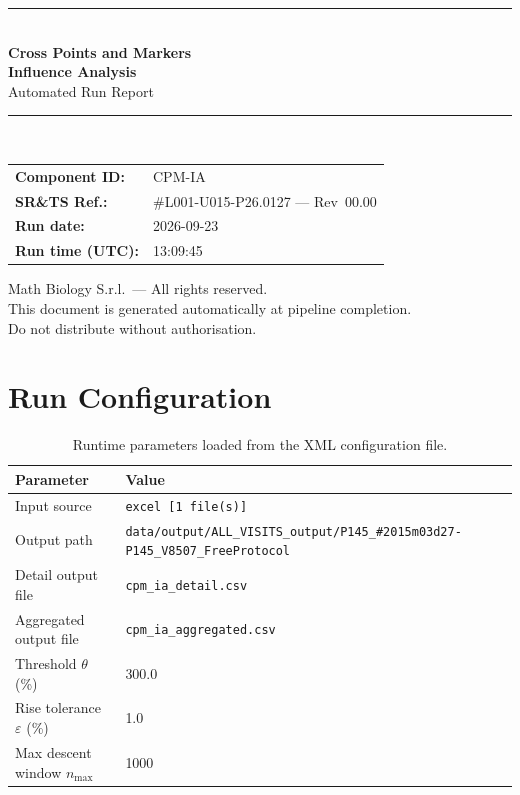\documentclass[a4paper,11pt]{article}
\begin{document}
\begin{titlepage}
\begin{center}
  \vspace*{1.8cm}
  {\color{dmaaccent}\rule{\linewidth}{1.5pt}}\\[0.6cm]
  {\LARGE\bfseries\color{dmaaccent}
    Cross Points and Markers\\[0.25cm]
    Influence Analysis}\\[0.4cm]
  {\Large Automated Run Report}\\[0.3cm]
  {\color{dmaaccent}\rule{\linewidth}{1.5pt}}\\[2cm]

  \begin{tabular}{ll}
    \textbf{Component ID:}   & CPM-IA \\[0.3cm]
    \textbf{SR\&TS Ref.:}    & \#L001-U015-P26.0127 --- Rev~00.00 \\[0.3cm]
    \textbf{Run date:}       & 2026-09-23 \\[0.3cm]
    \textbf{Run time (UTC):} & 13:09:45 \\
  \end{tabular}

  \vfill
  {\color{dmagray}\small
    Math Biology S.r.l.\ --- All rights reserved.\\
    This document is generated automatically at pipeline completion.\\
    Do not distribute without authorisation.}
\end{center}
\end{titlepage}

\tableofcontents
\clearpage

\section{Run Configuration}

\begin{table}[h!]
\centering
\small
\caption{Runtime parameters loaded from the XML configuration file.}
\begin{tabular}{ll}
\toprule
\textbf{Parameter} & \textbf{Value} \\
\midrule
Input source                      & \texttt{excel [1 file(s)]} \\
Output path                       & \texttt{data/output/ALL\_VISITS\_output/P145\_\#2015m03d27-P145\_V8507\_FreeProtocol} \\
Detail output file                & \texttt{cpm\_ia\_detail.csv} \\
Aggregated output file            & \texttt{cpm\_ia\_aggregated.csv} \\
Threshold $\theta$ (\%)           & 300.0 \\
Rise tolerance $\varepsilon$ (\%) & 1.0 \\
Max descent window $n_{\max}$     & 1000 \\
\bottomrule
\end{tabular}
\end{table}
\end{document}
